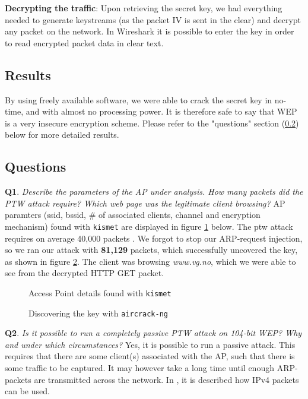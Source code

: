 \documentclass[a4paper,11pt]{article}
\begin{document}
\noindent \textbf{Decrypting the traffic}: Upon retrieving the secret key, we had everything needed to generate keystreams (as the packet IV is sent in the clear) and decrypt any packet on the network. In Wireshark it is possible to enter the key in order to read encrypted packet data in clear text.

\subsection{Results}

By using freely available software, we were able to crack the secret key in no-time, and with almost no processing power. It is therefore safe to say that WEP is a very insecure encryption scheme. Please refer to the "questions" section (\ref{q1}) below for more detailed results.

\subsection{Questions} \label{q1}

\textbf{Q1}. \textit{Describe the parameters of the AP under analysis. How many packets did the PTW attack require? Which web page was the legitimate client browsing?} AP paramters (\gls{ssid}, \gls{bssid}, \# of associated clients, channel and encryption mechanism) found with \texttt{kismet} are displayed in figure \ref{fig:kismet} below. The \gls{ptw} attack requires on average 40,000 packets \cite{ptw}. We forgot to stop our ARP-request injection, so we ran our attack with \textbf{81,129} packets, which successfully uncovered the key, as shown in figure \ref{fig:keyfound}. The client was browsing \textit{www.vg.no}, which we were able to see from the decrypted HTTP GET packet.

\begin{figure}[h!]
\centering
{}
\caption{\label{fig:kismet}Access Point details found with \texttt{kismet}}
\end{figure}

\begin{figure}[h!]
\centering
{}
\caption{\label{fig:keyfound}Discovering the key with \texttt{aircrack-ng}}
\end{figure}

\noindent\textbf{Q2}. \textit{Is it possible to run a completely passive PTW attack on 104-bit WEP? Why and under which circumstances?} Yes, it is possible to run a passive attack. This requires that there are some client(s) associated with the AP, such that there is some traffic to be captured. It may however take a long time until enough ARP-packets are transmitted across the network. In \cite{ptw}, it is described how IPv4 packets can be used. \\
\end{document}
